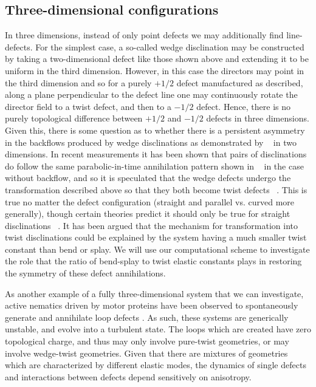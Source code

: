 \documentclass[reqno]{article}
\begin{document}
  \subsection{Three-dimensional configurations}
  In three dimensions, instead of only point defects we may additionally
  find line-defects.
  For the simplest case, a so-called wedge disclination may be constructed by
  taking a two-dimensional
  defect like those shown above and extending it to be uniform in the third
  dimension.
  However, in this case the directors may point in the third dimension and so
  for a purely $+1/2$ defect manufactured as described, along a plane
  perpendicular to the defect line one may continuously rotate the director
  field to a twist defect, and then to a $-1/2$ defect.
  Hence, there is no purely topological difference between $+1/2$ and $-1/2$
  defects in three dimensions.
  Given this, there is some question as to whether there is a persistent
  asymmetry in the backflows produced by wedge disclinations as demonstrated by
  ~\cite{svensek_hydrodynamics_2002} in two dimensions.
  In recent measurements it has been shown that pairs of disclinations do follow
  the same parabolic-in-time annihilation pattern shown in ~\cite{svensek_hydrodynamics_2002} in
  the case without backflow, and so it is speculated that the wedge defects
  undergo the transformation described above so that they both become twist
  defects ~\cite{zushi_scaling_2021}.
  This is true no matter the defect configuration (straight and parallel vs.
  curved more generally), though certain theories predict it should only be true
  for straight disclinations ~\cite{D0SM01899F}.
  It has been argued that the mechanism for transformation into twist
  disclinations could be explained by the system having a much smaller twist
  constant than bend or splay.
  We will use our computational scheme to investigate the role that the ratio of
  bend-splay to twist elastic constants plays in restoring the symmetry of these
  defect annihilations.

  As another example of a fully three-dimensional system that we can
  investigate, active nematics driven by motor proteins have been observed to
  spontaneously generate and annihilate loop defects
  \cite{doi:10.1126/science.aaz4547, PhysRevLett.124.088001}.
  As such, these systems are generically unstable, and evolve into a turbulent
  state.
  The loops which are created have zero topological charge, and thus may only
  involve pure-twist geometries, or may involve wedge-twist geometries.
  Given that there are mixtures of geometries which are characterized by
  different elastic modes, the dynamics of single defects and interactions
  between defects depend sensitively on anisotropy.
\end{document}

